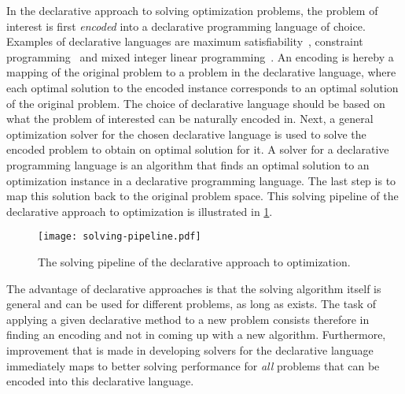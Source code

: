In the declarative approach to solving optimization problems, the problem of interest is first \emph{encoded} into a declarative programming language of choice.
Examples of declarative languages are maximum satisfiability~\autocite{handbook2-maxsat}, constraint programming~\autocite{} and mixed integer linear programming~\autocites{ChenEtAl2010-intro,KorteVygen2018-5}.
An encoding is hereby a mapping of the original problem to a problem in the declarative language, where each optimal solution to the encoded instance corresponds to an optimal solution of the original problem.
The choice of declarative language should be based on what the problem of interested can be naturally encoded in.
Next, a general optimization solver for the chosen declarative language is used to solve the encoded problem to obtain on optimal solution for it.
A solver for a declarative programming language is an algorithm that finds an optimal solution to an optimization instance in a declarative programming language.
The last step is to map this solution back to the original problem space.
This solving pipeline of the declarative approach to optimization is illustrated in \cref{fig:solving-pipeline}.

\begin{figure}
  \centering
  \texttt{[image: solving-pipeline.pdf]}
  \caption{The solving pipeline of the declarative approach to optimization.}\label{fig:solving-pipeline}
\end{figure}

The advantage of declarative approaches is that the solving algorithm itself is general and can be used for different problems, as long as  exists.
The task of applying a given declarative method to a new problem consists therefore in finding an encoding and not in coming up with a new algorithm.
Furthermore, improvement that is made in developing solvers for the declarative language immediately maps to better solving performance for \emph{all} problems that can be encoded into this declarative language.

